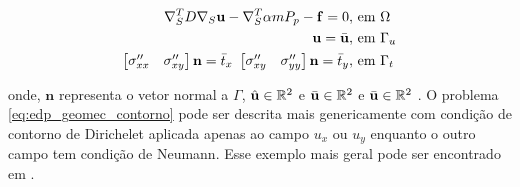 \begin{equation} \label{eq:edp_geomec_contorno}
\begin{aligned}
     \nabla_S^T D \nabla_S \mathbf{u} - \nabla_S^T\alpha m P_p - \mathbf{f} = 0, & \text{ em }\Omega  \\
     \mathbf{u} = \bar{\mathbf{u}},& \text{ em } \Gamma_u \\
    \begin{bmatrix}
        \sigma_{xx}^{\prime\prime} & \sigma_{xy}^{\prime\prime}
    \end{bmatrix} \mathbf{n} = \bar{t}_x \text{   }     \begin{bmatrix}
        \sigma_{xy}^{\prime\prime} & \sigma_{yy}^{\prime\prime}
    \end{bmatrix} \mathbf{n} = \bar{t}_y, & \text{   em } \Gamma_t 
\end{aligned}  
\end{equation}

onde, $\mathbf{n}$ representa o vetor normal a $\Gamma$, $\hat{\mathbf{u}} \in \mathbb{R}^2$ e $\bar{\mathbf{u}} \in \mathbb{R}^2$ e $\bar{\mathbf{u}} \in \mathbb{R}^2$  . O problema \eqref{eq:edp_geomec_contorno} pode ser descrita mais genericamente com condição de contorno de Dirichelet aplicada apenas ao campo $u_x$ ou $u_y$ enquanto o outro campo tem condição de Neumann. Esse exemplo mais geral pode ser encontrado em \citet{hughes}.

